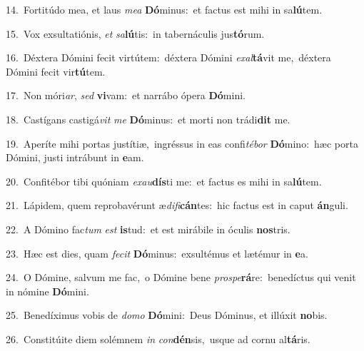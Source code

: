 {\numbfont\textcolor{\numbcolor}{14.}}~Fortitúdo mea, et laus \textit{me}\-\textit{a} \textbf{Dó}\-minus:~\star et factus est mihi in sa\-\textbf{lú}\-tem.\par
{\numbfont\textcolor{\numbcolor}{15.}}~Vox exsultatiónis, \textit{et} \textit{sa}\-\textbf{lú}tis:~\star in tabernáculis jus\-\textbf{tó}\-rum.\par
{\numbfont\textcolor{\numbcolor}{16.}}~Déxtera Dómini fecit virtútem:~\dagger déxtera Dómini \textit{ex}\-\textit{al}\textbf{tá}vit me,~\star déxtera Dómini fecit vir\-\textbf{tú}\-tem.\par
{\numbfont\textcolor{\numbcolor}{17.}}~Non móri\-\textit{ar}\-, \textit{sed} \textbf{vi}\-vam:~\star et narrábo ópera \textbf{Dó}\-mini.\par
{\numbfont\textcolor{\numbcolor}{18.}}~Castígans castigá\textit{vit} \textit{me} \textbf{Dó}\-minus:~\star et morti non trádi\textbf{dit} me.\par
{\numbfont\textcolor{\numbcolor}{19.}}~Aperíte mihi portas justítiæ,~\dagger ingréssus in eas confi\-\textit{té}\-\textit{bor} \textbf{Dó}\-mino:~\star hæc porta Dómini, justi intrábunt in \textbf{e}\-am.\par
{\numbfont\textcolor{\numbcolor}{20.}}~Confitébor tibi quóniam \textit{ex}\-\textit{au}\textbf{dís}ti me:~\star et factus es mihi in sa\-\textbf{lú}\-tem.\par
{\numbfont\textcolor{\numbcolor}{21.}}~Lápidem, quem reprobavérunt æ\-\textit{di}\-\textit{fi}\textbf{cán}tes:~\star hic factus est in caput \textbf{án}\-guli.\par
{\numbfont\textcolor{\numbcolor}{22.}}~A Dómino fac\textit{tum} \textit{est} \textbf{is}\-tud:~\star et est mirábile in óculis \textbf{nos}\-tris.\par
{\numbfont\textcolor{\numbcolor}{23.}}~Hæc est dies, quam \textit{fe}\-\textit{cit} \textbf{Dó}\-minus:~\star exsultémus et lætémur in \textbf{e}\-a.\par
{\numbfont\textcolor{\numbcolor}{24.}}~O Dómine, salvum me fac,~\dagger o Dómine bene \textit{pro}\-\textit{spe}\textbf{rá}re:~\star benedíctus qui venit in nómine \textbf{Dó}\-mini.\par
{\numbfont\textcolor{\numbcolor}{25.}}~Benedíximus vobis de \textit{do}\-\textit{mo} \textbf{Dó}\-mini:~\star Deus Dóminus, et illúxit \textbf{no}\-bis.\par
{\numbfont\textcolor{\numbcolor}{26.}}~Constitúite diem solémnem \textit{in} \textit{con}\-\textbf{dén}sis,~\star usque ad cornu al\-\textbf{tá}\-ris.\par
